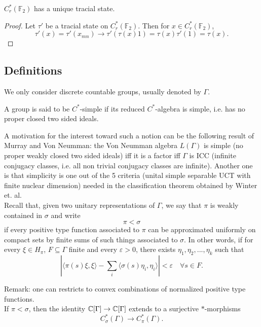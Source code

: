 \begin{cor}
$C^*_r(\mathbb F_2)$ has a unique tracial state.
\end{cor}

\begin{proof}
Let $\tau'$ be a tracial state on $C^*_r(\mathbb F_2)$. Then for $x\in C^*_r(\mathbb F_2)$,
\[\tau'(x)= \tau'(x_{mn}) \rightarrow \tau'(\tau(x)1) = \tau(x)\tau'(1) = \tau(x).\]
\end{proof}

\subsection{Definitions}

We only consider discrete countable groups, usually denoted by $\Gamma$.

\begin{definition}
A group is said to be $C^*$-simple if its reduced $C^*$-algebra is simple, i.e. has no proper closed two sided ideals. 
\end{definition}

A motivation for the interest toward such a notion can be the following result of Murray and Von Neumman: the Von Neumman algebra $L(\Gamma)$ is simple (no proper weakly closed two sided ideals) iff it is a factor iff $\Gamma$ is ICC (infinite conjugacy classes, i.e. all non trivial conjugacy classes are infinite). Another one is that simplicity is one out of the 5 criteria (unital simple separable UCT with finite nuclear dimension) needed in the classification theorem obtained by Winter et. al.\\  

Recall that, given two unitary representations of $\Gamma$, we say that $\pi$ is weakly contained in $\sigma$ and write 
\[\pi < \sigma\]
if every positive type function associated to $\pi$ can be approximated uniformly on compact sets by finite sums of such things associated to $\sigma$. In other words, if for every $\xi \in H_\pi$, $F\subseteq \Gamma$ finite and every $\varepsilon >0$, there exists $ \eta_1, \eta_2, ... , \eta_k$ such that
\[ | \langle \pi(s)\xi, \xi\rangle - \sum_i \langle \sigma (s)\eta_i,\eta_i \rangle| < \varepsilon \quad \forall s\in F.\]

Remark: one can restricts to convex combinations of normalized positive type functions.\\ 

If $\pi < \sigma$, then the identity $\mathbb C [\Gamma] \rightarrow \mathbb C [\Gamma]$ extends to a surjective $*$-morphisms
\[C_\sigma^*(\Gamma) \rightarrow C_\pi^*(\Gamma).\]

